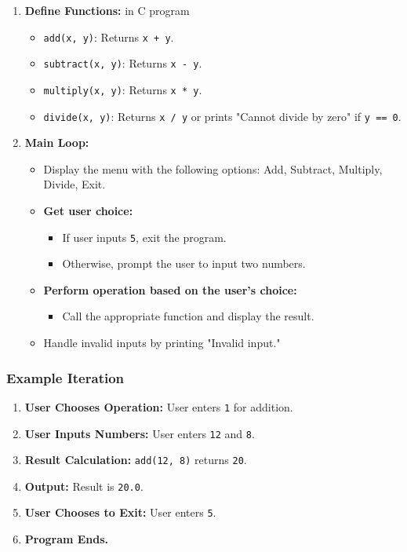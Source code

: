 \documentclass[a4paper,12pt]{article}
\begin{document}
\begin{enumerate}
    \item \textbf{Define Functions:} in C program
    \begin{itemize}
        \item \texttt{add(x, y)}: Returns \texttt{x + y}.
        \item \texttt{subtract(x, y)}: Returns \texttt{x - y}.
        \item \texttt{multiply(x, y)}: Returns \texttt{x * y}.
        \item \texttt{divide(x, y)}: Returns \texttt{x / y} or prints "Cannot divide by zero" if \texttt{y == 0}.
    \end{itemize}
    
    \item \textbf{Main Loop:}
    \begin{itemize}
        \item Display the menu with the following options: Add, Subtract, Multiply, Divide, Exit.
        \item \textbf{Get user choice:}
        \begin{itemize}
            \item If user inputs \texttt{5}, exit the program.
            \item Otherwise, prompt the user to input two numbers.
        \end{itemize}
        \item \textbf{Perform operation based on the user's choice:}
        \begin{itemize}
            \item Call the appropriate function and display the result.
        \end{itemize}
        \item Handle invalid inputs by printing "Invalid input."
    \end{itemize}
\end{enumerate}

\subsubsection*{Example Iteration}

\begin{enumerate}
    \item \textbf{User Chooses Operation:} User enters \texttt{1} for addition.
    \item \textbf{User Inputs Numbers:} User enters \texttt{12} and \texttt{8}.
    \item \textbf{Result Calculation:} \texttt{add(12, 8)} returns \texttt{20}.
    \item \textbf{Output:} Result is \texttt{20.0}.
    \item \textbf{User Chooses to Exit:} User enters \texttt{5}.
    \item \textbf{Program Ends.}
\end{enumerate}
\end{document}
